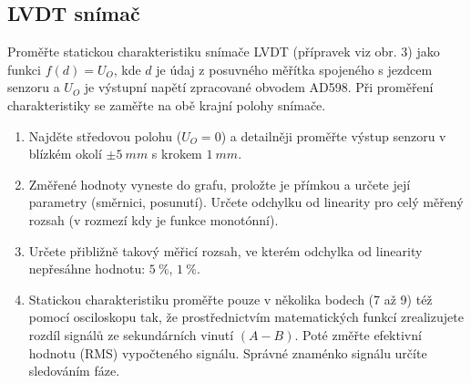 \documentclass[a4paper,12pt]{article}
\begin{document}
\subsection{LVDT snímač}
Proměřte statickou charakteristiku snímače LVDT (přípravek viz obr. 3) jako funkci $f(d) = U_O$, kde $d$ je
údaj z posuvného měřítka spojeného s jezdcem senzoru a $U_O$ je výstupní napětí zpracované obvodem
AD598. Při proměření charakteristiky se zaměřte na obě krajní polohy snímače.

\begin{enumerate}
\item Najděte středovou polohu ($U_O = 0$) a detailněji proměřte výstup senzoru v blízkém okolí $\pm 5\ mm$ s krokem $1\ mm$.
\item Změřené hodnoty vyneste do grafu, proložte je přímkou a určete její parametry (směrnici, posunutí). Určete odchylku od linearity pro celý měřený rozsah (v rozmezí kdy je funkce monotónní).
\item Určete přibližně takový měřicí rozsah, ve kterém odchylka od linearity nepřesáhne hodnotu: $5\ \%$, $1\ \%$.
\item Statickou charakteristiku proměřte pouze v několika bodech (7 až 9) též pomocí osciloskopu tak, že prostřednictvím matematických funkcí zrealizujete rozdíl signálů ze sekundárních vinutí $(A - B)$. Poté změřte efektivní hodnotu (RMS) vypočteného signálu. Správné znaménko signálu určíte sledováním fáze.
\end{enumerate}
\end{document}
